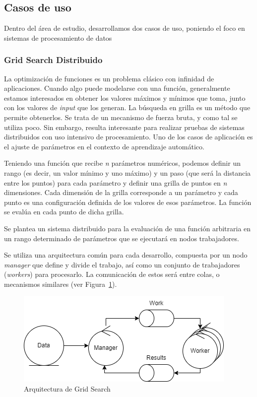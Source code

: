 \documentclass[11pt]{article}
\let\Oldsubsection\subsection
\renewcommand{\subsection}{\FloatBarrier\Oldsubsection}
\let\Oldsubsubsection\subsubsection
\renewcommand{\subsubsection}{\FloatBarrier\Oldsubsubsection}
\newcommand{\english}[1]{\textit{#1}}
\begin{document}
\newpage

\subsection{Casos de uso}

Dentro del área de estudio, desarrollamos dos casos de uso, poniendo el foco en sistemas de procesamiento de datos

\subsubsection{Grid Search Distribuido}

La optimización de funciones es un problema clásico con infinidad de aplicaciones. Cuando algo puede modelarse con una función, generalmente estamos interesados en obtener los valores máximos y mínimos que toma, junto con los valores de \english{input} que los generan. La búsqueda en grilla es un método que permite obtenerlos. Se trata de un mecanismo de fuerza bruta, y como tal se utiliza poco. Sin embargo, resulta interesante para realizar pruebas de sistemas distribuidos con uso intensivo de procesamiento. Uno de los casos de aplicación es el ajuste de parámetros en el contexto de aprendizaje automático.

Teniendo una función que recibe \textit{n} parámetros numéricos, podemos definir un rango (es decir, un valor mínimo y uno máximo) y un paso (que será la distancia entre los puntos) para cada parámetro y definir una grilla de puntos en \textit{n} dimensiones.
Cada dimensión de la grilla corresponde a un parámetro y cada punto es una configuración definida de los valores de esos parámetros.
La función se evalúa en cada punto de dicha grilla.

Se plantea un sistema distribuido para la evaluación de una función arbitraria en un rango determinado de parámetros que se ejecutará en nodos trabajadores.

Se utiliza una arquitectura común para cada desarrollo, compuesta por un nodo \english{manager} que define y divide el trabajo, así como un conjunto de trabajadores (\english{workers}) para procesarlo. La comunicación de estos será entre colas, o mecanismos similares (ver Figura~\ref{fig:sis_dist:grid_search_arch}).

\begin{figure}[h]
    \centering
    \includegraphics[scale=0.5]{resources/distributed_systems/grid_search_arch.png}
    \caption{Arquitectura de Grid Search}
    \label{fig:sis_dist:grid_search_arch}
\end{figure}
\end{document}
